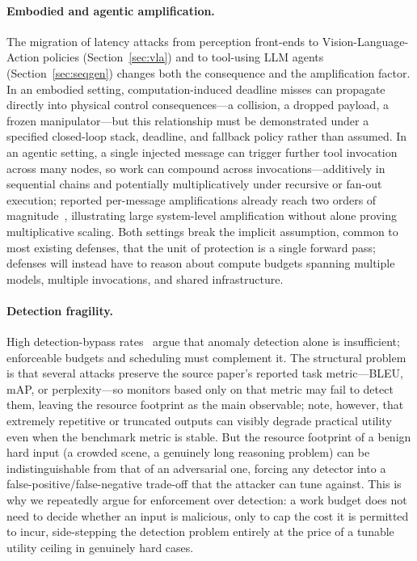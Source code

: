 \documentclass[acmsmall,screen,review,nonacm]{acmart}
\begin{document}
\paragraph{Embodied and agentic amplification.} The migration of latency attacks from perception front-ends to Vision-Language-Action policies (Section~\ref{sec:vla}) and to tool-using LLM agents (Section~\ref{sec:seqgen}) changes both the consequence and the amplification factor. In an embodied setting, computation-induced deadline misses can propagate directly into physical control consequences---a collision, a dropped payload, a frozen manipulator---but this relationship must be demonstrated under a specified closed-loop stack, deadline, and fallback policy rather than assumed. In an agentic setting, a single injected message can trigger further tool invocation across many nodes, so work can compound across invocations---additively in sequential chains and potentially multiplicatively under recursive or fan-out execution; reported per-message amplifications already reach two orders of magnitude~\cite{liang2026mobius,zhou2026beyondmaxtokens}, illustrating large system-level amplification without alone proving multiplicative scaling. Both settings break the implicit assumption, common to most existing defenses, that the unit of protection is a single forward pass; defenses will instead have to reason about compute budgets spanning multiple models, multiple invocations, and shared infrastructure.

\paragraph{Detection fragility.} High detection-bypass rates~\cite{liu2026reasoningbomb} argue that anomaly detection alone is insufficient; enforceable budgets and scheduling must complement it. The structural problem is that several attacks preserve the source paper's reported task metric---BLEU, mAP, or perplexity---so monitors based only on that metric may fail to detect them, leaving the resource footprint as the main observable; note, however, that extremely repetitive or truncated outputs can visibly degrade practical utility even when the benchmark metric is stable. But the resource footprint of a benign hard input (a crowded scene, a genuinely long reasoning problem) can be indistinguishable from that of an adversarial one, forcing any detector into a false-positive/false-negative trade-off that the attacker can tune against. This is why we repeatedly argue for enforcement over detection: a work budget does not need to decide whether an input is malicious, only to cap the cost it is permitted to incur, side-stepping the detection problem entirely at the price of a tunable utility ceiling in genuinely hard cases.
\end{document}
